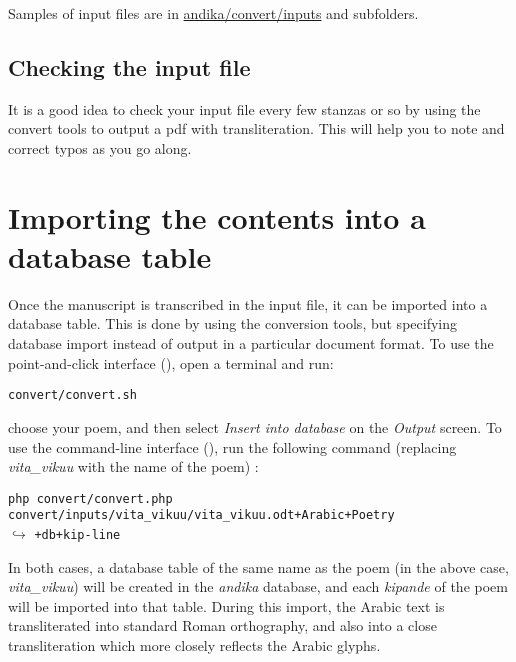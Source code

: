 Samples of input files are in \url{andika/convert/inputs} and subfolders.

\subsection{Checking the input file}

It is a good idea to check your input file every few stanzas or so by using the convert tools to output a pdf with transliteration.  This will help you to note and correct typos as you go along.


\section{Importing the contents into a database table}
\label{s:import}

Once the manuscript is transcribed in the input file, it can be imported into a database table.  This is done by using the conversion tools, but specifying database import instead of output in a particular document format.  To use the point-and-click interface (), open a terminal and run:

\verb|convert/convert.sh|

choose your poem, and then select \textit{Insert into database} on the \textit{Output} screen.  To use the command-line interface (), run the following command (replacing \textit{vita_vikuu} with the name of the poem) :

\verb|php convert/convert.php convert/inputs/vita_vikuu/vita_vikuu.odt+Arabic+Poetry|\\
$\hookrightarrow$ \verb|+db+kip-line|

In both cases, a database table of the same name as the poem (in the above case, \textit{vita_vikuu}) will be created in the \textit{andika} database, and each \textit{kipande} of the poem will be imported into that table.  During this import, the Arabic text is transliterated into standard Roman orthography, and also into a close transliteration which more closely reflects the Arabic glyphs.


